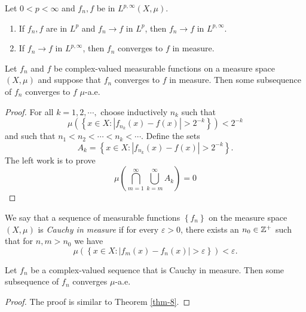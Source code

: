 \begin{proposition}
  Let $0<p<\infty$ and $f_n,f$ be in $L^{p,\infty}(X,\mu)$.
  \begin{enumerate}
    \item If $f_n,f$ are in $L^{p}$ and $f_n\to f$ in $L^{p}$, then $f_n\to f$ in $L^{p,\infty}$.
    \item If $f_n\to f $ in $L^{p,\infty}$, then $f_n$ converges to $f$ in measure.
  \end{enumerate}
\end{proposition}
\begin{theorem}\label{thm-8}
  Let $f_n$ and $f$ be complex-valued measurable functions on a measure space $(X,\mu)$ and suppose that $f_n$ converges to $f$ in measure. Then some subsequence of $f_n$ converges to $f$ $\mu$-a.e.
\end{theorem}
\begin{proof}
  For all $k=1,2,\cdots,$ choose inductively $n_k$ such that 
  \begin{equation}
    \mu\left( \left\{ x\in X:|f_{n_k}(x)-f(x)|>2^{-k} \right\}  \right) <2^{-k}
  \end{equation}
  and such that $n_1<n_2<\cdots<n_k<\cdots$. Define the sets
  \begin{equation}
    A_k=\left\{ x\in X:|f_{n_k}(x)-f(x)|>2^{-k} \right\} .
  \end{equation}
  The left work is to prove 
  \begin{equation}
    \mu\left( \bigcap_{m=1} ^{\infty}\bigcup_{k=m} ^{\infty}A_k \right) =0
  \end{equation}
\end{proof}
\begin{definition}
  We say that a sequence of measurable functions $\left\{ f_n \right\} $ on the measure space $\left( X,\mu \right) $ is \textit{Cauchy in measure} if for every $\varepsilon >0$, there exists an $n_0\in \mathbb{Z}^{+}$ such that for $n,m>n_0$ we have
  \[
    \mu\left( \left\{ x\in X:|f_{m}(x)-f_n(x)|>\varepsilon  \right\}  \right) <\varepsilon .
  \] 
\end{definition}
\begin{theorem}
  Let $f_n$ be a complex-valued sequence that is Cauchy in measure. Then some subsequence of $f_n$ converges $\mu$-a.e.
\end{theorem}
\begin{proof}
  The proof is similar to Theorem \ref{thm-8}. 
\end{proof}
